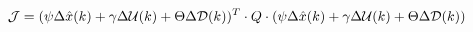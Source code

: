 \begin{equation}\label{eq:cost_function_with_all_the_crap}
	\CMcal{J} = (\psi\Delta \hat{x}(k) + \gamma\Delta \CMcal{U}(k) + \Theta\Delta \CMcal{D}(k))^T\cdot Q \cdot (\psi\Delta \hat{x}(k) + \gamma\Delta \CMcal{U}(k) + \Theta\Delta \CMcal{D}(k))
\end{equation}



